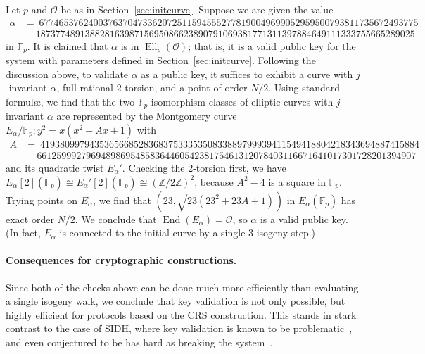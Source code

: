 \documentclass{llncs}
\newcommand{\F}{\mathbb{F}}
\newcommand{\Z}{\mathbb{Z}}
\renewcommand{\O}{\mathcal{O}}
\DeclareMathOperator{\End}{End}
\DeclareMathOperator{\Ell}{Ell}
\begin{document}
\begin{example}
    Let $p$ and $\O$ be as in Section~\ref{sec:initcurve}.
    Suppose we are given the value
    \begin{align*}
        \alpha & = 
        \ 
        \scriptstyle
        67746537624003763704733620725115945552778190049699052959500793811735672493775
        \\
        & \quad\ 
        \scriptstyle
        18737748913882816398715695086623890791069381771311397884649111333755665289025
    \end{align*}
    in $\F_p$.  It is claimed that $\alpha$ is in $\Ell_p(\O)$;
    that is, it is a valid public key for the system with parameters
    defined in Section~\ref{sec:initcurve}.
    Following the discussion above,
    to validate $\alpha$ as a public key,
    it suffices to exhibit a curve with $j$-invariant $\alpha$,
    full rational $2$-torsion,
    and a point of order $N/2$.
    Using standard formul\ae{},
    we find that the two $\F_p$-isomorphism classes of elliptic curves
    with $j$-invariant $\alpha$
    are represented by the Montgomery curve
    $E_\alpha/\F_p: y^2 = x(x^2 + Ax + 1)$
    with
    \begin{align*}
        A & = 
        \ 
        \scriptstyle 
        41938099794353656685283683753335350833889799939411549418804218343694887415884
        \\
        & \quad\ 
        \scriptstyle 
        66125999279694898695485836446054238175461312078403116671641017301728201394907
    \end{align*}
    and its quadratic twist $E_\alpha'$.
    Checking the $2$-torsion first,
    we have $E_\alpha[2](\F_p) \cong E_\alpha'[2](\F_p) \cong (\Z/2\Z)^2$,
    because $A^2 - 4$ is a square in $\F_p$.
    Trying points on $E_\alpha$,
    we find that $(23,\sqrt{23(23^2 + 23A + 1)})$ in $E_\alpha(\F_p)$
    has exact order $N/2$.
    We conclude that $\End(E_\alpha) = \O$,
    so $\alpha$ is a valid public key.
    (In fact, $E_\alpha$ is connected to the initial curve
    by a single $3$-isogeny step.)
\end{example}

\paragraph{Consequences for cryptographic constructions.}
Since both of the checks above can be done much more efficiently 
than evaluating a single isogeny walk, 
we conclude that key validation is not only possible,
but highly efficient for protocols based on the CRS construction. 
This stands in stark contrast to the case of SIDH,
where key validation is known to be
problematic~\cite{galbraithsecurity}, and even conjectured to be has
hard as breaking the system~\cite{cryptoeprint:2018:336}.
\end{document}
